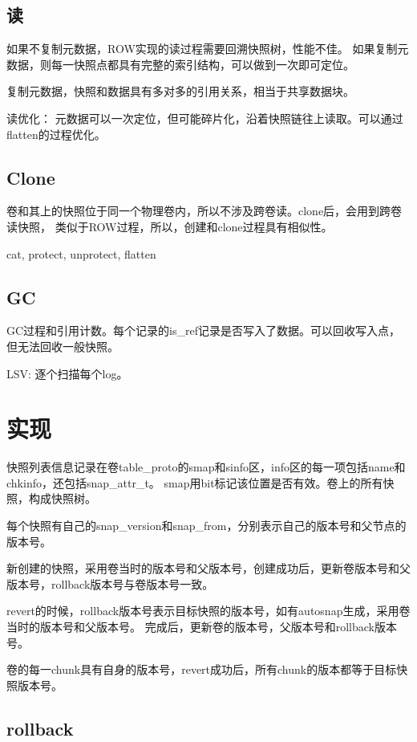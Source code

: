 \subsection{读}

如果不复制元数据，ROW实现的读过程需要回溯快照树，性能不佳。
如果复制元数据，则每一快照点都具有完整的索引结构，可以做到一次即可定位。

复制元数据，快照和数据具有多对多的引用关系，相当于共享数据块。

读优化： 元数据可以一次定位，但可能碎片化，沿着快照链往上读取。可以通过flatten的过程优化。

\subsection{Clone}

卷和其上的快照位于同一个物理卷内，所以不涉及跨卷读。clone后，会用到跨卷读快照，
类似于ROW过程，所以，创建和clone过程具有相似性。

cat, protect, unprotect, flatten

\subsection{GC}

GC过程和引用计数。每个记录的is\_ref记录是否写入了数据。可以回收写入点，但无法回收一般快照。

LSV: 逐个扫描每个log。

\section{实现}

快照列表信息记录在卷table\_proto的smap和sinfo区，info区的每一项包括name和chkinfo，还包括snap\_attr\_t。
smap用bit标记该位置是否有效。卷上的所有快照，构成快照树。

每个快照有自己的snap\_version和snap\_from，分别表示自己的版本号和父节点的版本号。

新创建的快照，采用卷当时的版本号和父版本号，创建成功后，更新卷版本号和父版本号，rollback版本号与卷版本号一致。

revert的时候，rollback版本号表示目标快照的版本号，如有autosnap生成，采用卷当时的版本号和父版本号。
完成后，更新卷的版本号，父版本号和rollback版本号。

卷的每一chunk具有自身的版本号，revert成功后，所有chunk的版本都等于目标快照版本号。

\subsection{rollback}

